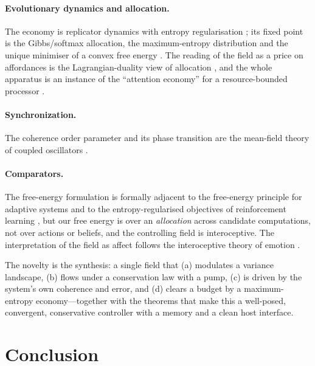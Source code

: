 \documentclass[11pt,a4paper]{article}
\theoremstyle{plain}
\theoremstyle{definition}
\theoremstyle{remark}
\begin{document}
\paragraph{Evolutionary dynamics and allocation.} The economy is replicator
dynamics with entropy regularisation \citep{taylor1978,hofbauer1998,
maynardsmith1982}; its fixed point is the Gibbs/softmax allocation, the
maximum-entropy distribution \citep{jaynes1957,cover2006} and the unique
minimiser of a convex free energy \citep{boyd2004}. The reading of the field as
a price on affordances is the Lagrangian-duality view of allocation
\citep{boyd2004,kelly1998,arrow1954}, and the whole apparatus is an instance of
the ``attention economy'' for a resource-bounded processor \citep{simon1971}.

\paragraph{Synchronization.} The coherence order parameter and its phase
transition are the mean-field theory of coupled oscillators
\citep{kuramoto1984,strogatz2000,winfree1980}.

\paragraph{Comparators.} The free-energy formulation is formally adjacent to the
free-energy principle for adaptive systems \citep{friston2010} and to the
entropy-regularised objectives of reinforcement learning \citep{sutton2018},
but our free energy is over an \emph{allocation} across candidate computations,
not over actions or beliefs, and the controlling field is interoceptive. The
interpretation of the field as affect follows the interoceptive theory of
emotion \citep{craig2002,damasio1994,barrett2017}.

The novelty is the synthesis: a single field that (a) modulates a variance
landscape, (b) flows under a conservation law with a pump, (c) is driven by the
system's own coherence and error, and (d) clears a budget by a maximum-entropy
economy---together with the theorems that make this a well-posed, convergent,
conservative controller with a memory and a clean host interface.

\section{Conclusion}
\label{sec:conclusion}
\end{document}
